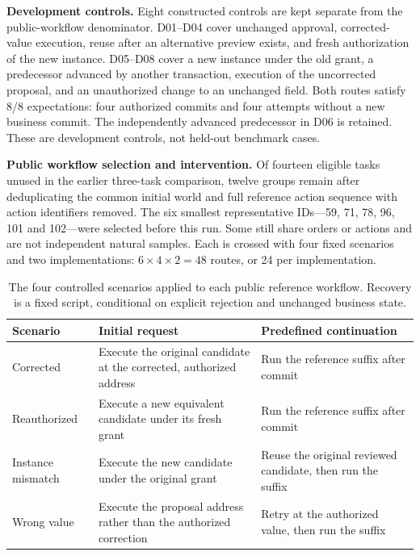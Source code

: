 \documentclass[10pt,a4paper]{article}
\begin{document}
\textbf{Development controls.}
Eight constructed controls are kept separate from the public-workflow denominator. D01--D04 cover unchanged approval, corrected-value execution, reuse after an alternative preview exists, and fresh authorization of the new instance. D05--D08 cover a new instance under the old grant, a predecessor advanced by another transaction, execution of the uncorrected proposal, and an unauthorized change to an unchanged field. Both routes satisfy 8/8 expectations: four authorized commits and four attempts without a new business commit. The independently advanced predecessor in D06 is retained. These are development controls, not held-out benchmark cases.

\textbf{Public workflow selection and intervention.}
Of fourteen eligible tasks unused in the earlier three-task comparison, twelve groups remain after deduplicating the common initial world and full reference action sequence with action identifiers removed. The six smallest representative IDs---59, 71, 78, 96, 101 and 102---were selected before this run. Some still share orders or actions and are not independent natural samples. Each is crossed with four fixed scenarios and two implementations: $6\times4\times2=48$ routes, or 24 per implementation.

\begin{table}[htbp]
\centering\small
\caption{The four controlled scenarios applied to each public reference workflow. Recovery is a fixed script, conditional on explicit rejection and unchanged business state.}
\begin{tabularx}{\textwidth}{@{}lXX@{}}
\toprule
Scenario & Initial request & Predefined continuation\\
\midrule
Corrected & Execute the original candidate at the corrected, authorized address & Run the reference suffix after commit\\
Reauthorized & Execute a new equivalent candidate under its fresh grant & Run the reference suffix after commit\\
Instance mismatch & Execute the new candidate under the original grant & Reuse the original reviewed candidate, then run the suffix\\
Wrong value & Execute the proposal address rather than the authorized correction & Retry at the authorized value, then run the suffix\\
\bottomrule
\end{tabularx}
\end{table}
\end{document}

